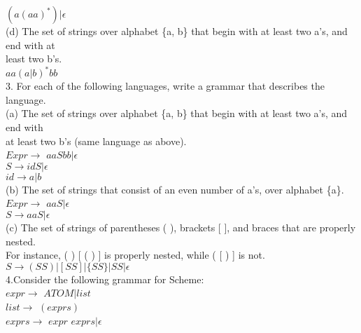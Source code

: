 \documentclass[12pt]{article}
\begin{document}
\begin{flushleft}
\qquad \qquad \qquad
$(a(aa)^*)\big|\epsilon$\\
[4mm]

\qquad \qquad (d) The set of strings over alphabet \{a, b\} that begin with at least two a’s, and end with at\\
\qquad \qquad \quad \quad 
least two b’s.\\   	
[2mm]

\qquad \qquad \qquad
$aa(a\big|b)^*bb$\\
[8mm]

3. For each of the following languages, write a grammar that describes the language.\\ 
[2mm]

\qquad \qquad 
(a) The set of strings over alphabet \{a, b\} that begin with at least two a’s, and end with\\
\qquad \qquad \quad \quad  
at least two b’s (same language as above).\\
[2mm] 
\qquad \qquad \quad \quad 
$Expr \rightarrow$ $aaSbb \big| \epsilon$\\
\qquad \qquad \quad \quad 
$S \rightarrow idS \big| \epsilon$\\
\qquad \qquad \quad \quad 
$id \rightarrow  a \big| b$\\
[2mm]

\qquad \qquad (b) The set of strings that consist of an even number of 
a's, over alphabet \{a\}.\\
[2mm]
\qquad \qquad \quad \quad 
$Expr \rightarrow$ $aaS \big| \epsilon$\\
\qquad \qquad \quad \quad 
$S \rightarrow aaS \big| \epsilon$\\
[2mm]

\qquad \qquad (c) The set of strings of  parentheses ( ), brackets [ ], and  braces { } that are properly nested.\\
\qquad \qquad \quad \quad For instance, ( ) [{ } ( ) ] is properly nested, while ( [ ) ] is not.\\
[2mm]
\qquad \qquad \quad \quad 
$S \rightarrow  (SS)\big| [SS]\big| \{SS\}\big| SS\big| \epsilon$\\
[8mm]

4.Consider the following grammar for Scheme:\\
[6mm] 
\qquad \qquad 
$expr \rightarrow$ $ATOM \big| list$\\	
\qquad \qquad 
$list \rightarrow$ $(exprs)$\\
\qquad \qquad 	
$exprs \rightarrow$ $expr$ $exprs \big| \epsilon$\\	
[4mm]


\end{flushleft}
\end{document}
